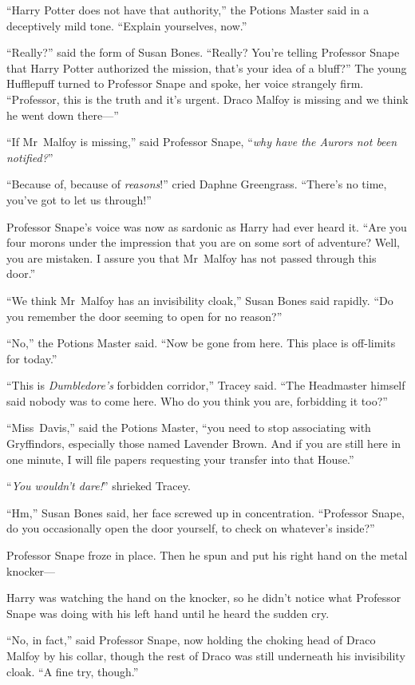 “Harry Potter does not have that authority,” the Potions Master said in a deceptively mild tone. “Explain yourselves, now.”

“Really?” said the form of Susan Bones. “Really? You’re telling Professor Snape that Harry Potter authorized the mission, that’s your idea of a bluff?” The young Hufflepuff turned to Professor Snape and spoke, her voice strangely firm. “Professor, this is the truth and it’s urgent. Draco Malfoy is missing and we think he went down there—”

“If Mr~Malfoy is missing,” said Professor Snape, “\emph{why have the Aurors not been notified?}”

“Because of, because of \emph{reasons}!” cried Daphne Greengrass. “There’s no time, you’ve got to let us through!”

Professor Snape’s voice was now as sardonic as Harry had ever heard it. “Are you four morons under the impression that you are on some sort of adventure? Well, you are mistaken. I assure you that Mr~Malfoy has not passed through this door.”

“We think Mr~Malfoy has an invisibility cloak,” Susan Bones said rapidly. “Do you remember the door seeming to open for no reason?”

“No,” the Potions Master said. “Now be gone from here. This place is off-limits for today.”

“This is \emph{Dumbledore’s} forbidden corridor,” Tracey said. “The Headmaster himself said nobody was to come here. Who do you think you are, forbidding it too?”

“Miss~Davis,” said the Potions Master, “you need to stop associating with Gryffindors, especially those named Lavender Brown. And if you are still here in one minute, I will file papers requesting your transfer into that House.”

“\emph{You wouldn’t dare!}” shrieked Tracey.

“Hm,” Susan Bones said, her face screwed up in concentration. “Professor Snape, do you occasionally open the door yourself, to check on whatever’s inside?”

Professor Snape froze in place. Then he spun and put his right hand on the metal knocker—

Harry was watching the hand on the knocker, so he didn’t notice what Professor Snape was doing with his left hand until he heard the sudden cry.

“No, in fact,” said Professor Snape, now holding the choking head of Draco Malfoy by his collar, though the rest of Draco was still underneath his invisibility cloak. “A fine try, though.”

